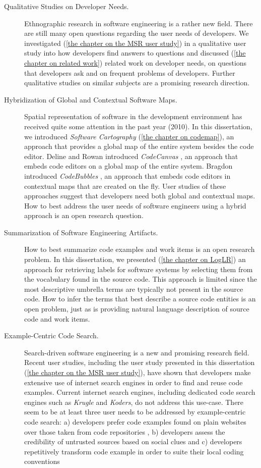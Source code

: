 \begin{description}
\item[Qualitative Studies on Developer Needs.] 
%
Ethnographic research in software engineering is a rather new field. There are still many open questions regarding the user needs of developers. We investigated (\autoref{the chapter on the MSR user study}) in a qualitative user study into how developers find answers to questions and discussed (\autoref{the chapter on related work}) related work on developer needs, on questions that developers ask and on frequent problems of developers. Further qualitative studies on similar subjects are a promising research direction.

\item[Hybridization of Global and Contextual Software Maps.] 
%
Spatial representation of software in the development environment has received quite some attention in the past year (2010). In this dissertation, we introduced \emph{Software Cartography} (\autoref{the chapter on codemap}), an approach that provides a global map of the entire system besides the code editor. Deline and Rowan introduced \emph{CodeCanvas} \cite{Deli10a}, an approach that embeds code editors on a global map of the entire system. Bragdon \etal introduced \emph{CodeBubbles} \cite{Brag10a,Brag10b}, an approach that embeds code editors in contextual maps that are created on the fly. User studies of these approaches suggest that developers need both global and contextual maps. How to best address the user needs of software engineers using a hybrid approach is an open research question. 

\item[Summarization of Software Engineering Artifacts.] 
%
How to best summarize code examples and work items is an open research problem.
In this dissertation, we presented (\autoref{the chapter on LogLR}) an approach for retrieving labels for software systems by selecting them from the vocabulary found in the source code. This approach is limited since the most descriptive umbrella terms are typically not present in the source code. How to infer the terms that best describe a source code entities is an open problem, just as is providing natural language description of source code and work items.

\item[Example-Centric Code Search.] Search-driven software engineering is a new and promising research field. Recent user studies, including the user study presented in this dissertation (\autoref{the chapter on the MSR user study}), have shown that developers make extensive use of internet search engines in order to find and reuse code examples. Current internet search engines, including dedicated code search engines such as \emph{Krugle} and \emph{Koders}, do not address this use-case. There seem to be at least three user needs to be addressed by example-centric code search: a) developers prefer code examples found on plain websites over those taken from code repositories , b) developers assess the credibility of untrusted sources based on social clues and c) developers repetitively transform code example in order to suite their local coding conventions


\end{description}
